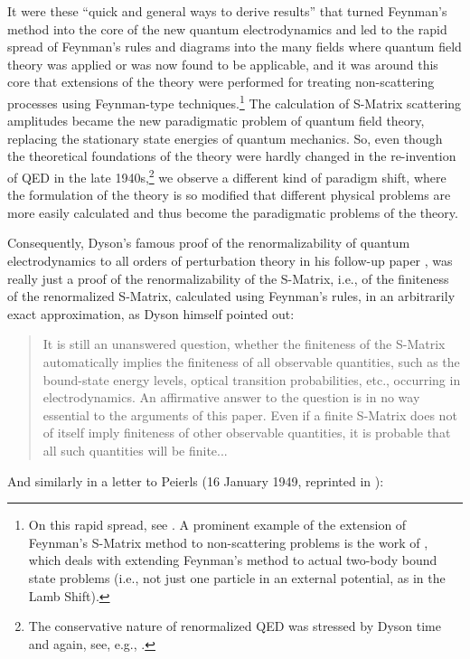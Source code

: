 \documentclass[12pt,a4paper]{article}
\begin{document}
It were these ``quick and general ways to derive results'' that turned Feynman's method into the core of the new quantum electrodynamics and led to the rapid spread of Feynman's rules and diagrams into the many fields where quantum field theory was applied or was now found to be applicable, and it was around this core that extensions of the theory were performed for treating non-scattering processes using Feynman-type techniques.\footnote{On this rapid spread, see \citep{kaiser}. A prominent example of the extension of Feynman's S-Matrix method to non-scattering problems is the work of \cite{bethe_1951_a-relativistic}, which deals with extending Feynman's method to actual two-body bound state problems (i.e., not just one particle in an external potential, as in the Lamb Shift).} The calculation of S-Matrix scattering amplitudes became the new paradigmatic problem of quantum field theory, replacing the stationary state energies of quantum mechanics. So, even though the theoretical foundations of the theory were hardly changed in the re-invention of QED in the late 1940s,\footnote{The conservative nature of renormalized QED was stressed by Dyson time and again, see, e.g., \citep{dyson_1965_tomonaga}.} we observe a different kind of paradigm shift, where the formulation of the theory is so modified that different physical problems are more easily calculated and thus become the paradigmatic problems of the theory.

Consequently, Dyson's famous proof of the renormalizability of quantum electrodynamics to all orders of perturbation theory in his follow-up paper \citep{dyson_1949_the-s}, was really just a proof of the renormalizability of the S-Matrix, i.e., of the finiteness of the renormalized S-Matrix, calculated using Feynman's rules, in an arbitrarily exact approximation, as Dyson himself pointed out:

\begin{quote}
It is still an unanswered question, whether the finiteness of the S-Matrix automatically implies the finiteness of all observable quantities, such as the bound-state energy levels, optical transition probabilities, etc., occurring in electrodynamics. An affirmative answer to the question is in no way essential to the arguments of this paper. Even if a finite S-Matrix does not of itself imply finiteness of other observable quantities, it is probable that all such quantities will be finite... \citep[p. 1736]{dyson_1949_the-s}
\end{quote}

And similarly in a letter to Peierls (16 January 1949, reprinted in \citep{lee_2009_sir}):
\end{document}
